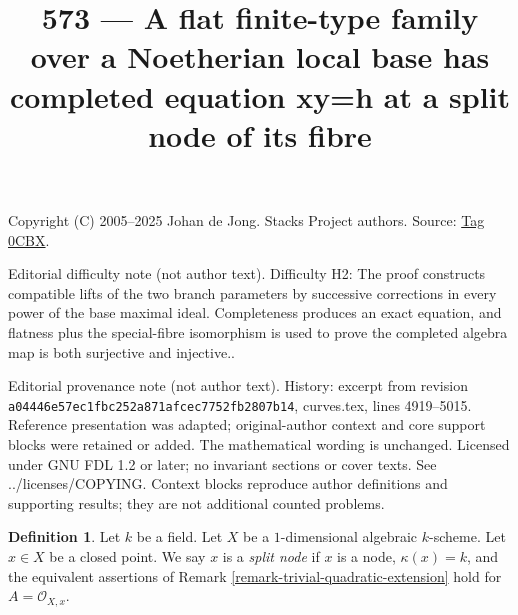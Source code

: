 \documentclass{amsart}
\theoremstyle{plain}
\theoremstyle{definition}
\newtheorem{definition}[subsection]{Definition}
\theoremstyle{remark}
\numberwithin{equation}{subsection}
\begin{document}
\title[Stacks Project, Tag 0CBX]{573 --- A flat finite-type family over a Noetherian local base has completed equation xy=h at a split node of its fibre}
\maketitle
\noindent Copyright (C) 2005--2025 Johan de Jong. Stacks Project authors. Source: \href{https://stacks.math.columbia.edu/tag/0CBX}{Tag 0CBX}.

\noindent Editorial difficulty note (not author text). Difficulty H2: The proof constructs compatible lifts of the two branch parameters by successive corrections in every power of the base maximal ideal. Completeness produces an exact equation, and flatness plus the special-fibre isomorphism is used to prove the completed algebra map is both surjective and injective..

\noindent Editorial provenance note (not author text). History: excerpt from revision \texttt{a0444\allowbreak 6e57e\allowbreak c1fbc\allowbreak 252a8\allowbreak 71afc\allowbreak ec775\allowbreak 2fb28\allowbreak 07b14}, curves.tex, lines 4919--5015. Reference presentation was adapted; original-author context and core support blocks were retained or added. The mathematical wording is unchanged. Licensed under GNU FDL 1.2 or later; no invariant sections or cover texts. See ../licenses/COPYING. Context blocks reproduce author definitions and supporting results; they are not additional counted problems.

\begin{definition}
\label{definition-split-node}
Let $k$ be a field. Let $X$ be a $1$-dimensional algebraic $k$-scheme.
Let $x \in X$ be a closed point. We say $x$ is a {\it split node}
if $x$ is a node, $\kappa(x) = k$, and the equivalent assertions of
Remark \ref{remark-trivial-quadratic-extension}
hold for $A = \mathcal{O}_{X, x}$.
\end{definition}
\end{document}
